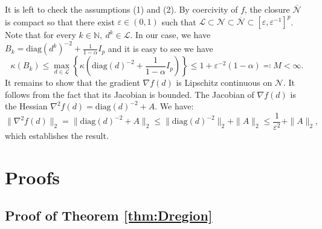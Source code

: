 \documentclass[12pt]{amsart}
\numberwithin{equation}{section}
\numberwithin{equation}{section}
\theoremstyle{plain}
\theoremstyle{definition}
\newcommand{\diag}[1]{\mathrm{diag}(#1)}
\begin{document}
It is left to check the assumptions (1) and (2). By coercivity of $f$, the closure $\overline{\mathcal{N}}$ is compact so that there exist $\varepsilon\in(0,1)$ such that $\mathcal{L} \subset \mathcal{N}\subset \overline{\mathcal{N}} \subset [\varepsilon, \varepsilon^{-1}]^p$. Note that for every $k\in\mathbb{N},\ d^{k}\in\mathcal{L}$. In our case, we have $B_k = \diag{d^{k}}^{-2}+\frac{1}{1-\alpha}I_p$ and it is easy to see we have 
\[
\kappa(B_k)  \leq \max_{d\in\mathcal{L}} \left\{\kappa\left( \diag{d}^{-2}+\frac{1}{1-\alpha}I_p\right)\right\} \leq 1 + \varepsilon^{-2}(1-\alpha) \eqqcolon M < \infty. 
\]
It remains to show that the gradient $\nabla f(d)$ is Lipschitz continuous on $\mathcal{N}$. It follows from the fact that its Jacobian is bounded. The Jacobian of $\nabla f(d)$ is the Hessian $\nabla^2 f(d) = \diag{d}^{-2}+A$. We have:
\[
\|\nabla^2 f(d)\|_2 = \|\diag{d}^{-2}+A\|_2 \leq \|\diag{d}^{-2}\|_2 + \|A\|_2 \leq \frac{1}{\varepsilon^2} + \|A\|_2,
\]
which establishes the result.










\section{Proofs}\label{sec:proofs}

\subsection{Proof of Theorem \ref{thm:Dregion}}
\end{document}
